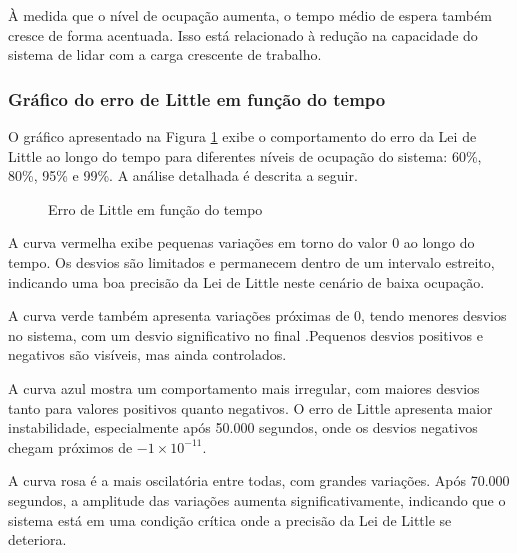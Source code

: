 À medida que o nível de ocupação aumenta, o tempo médio de espera também cresce de forma acentuada. Isso está relacionado à redução na capacidade do sistema de lidar com a carga crescente de trabalho.

\subsubsection{Gráfico do erro de Little em função do tempo}
O gráfico apresentado na Figura \ref{fig:littleE2} exibe o comportamento do erro da Lei de Little ao longo do tempo para diferentes níveis de ocupação do sistema: 60\%, 80\%, 95\% e 99\%. A análise detalhada é descrita a seguir.

\begin{figure}[h!]
   \centering
   
   \caption{Erro de Little em função do tempo}
   \label{fig:littleE2}
\end{figure}

A curva vermelha exibe pequenas variações em torno do valor 0 ao longo do tempo. Os desvios são limitados e permanecem dentro de um intervalo estreito, indicando uma boa precisão da Lei de Little neste cenário de baixa ocupação.

A curva verde também apresenta variações próximas de 0, tendo menores desvios no sistema, com um desvio significativo no final .Pequenos desvios positivos e negativos são visíveis, mas ainda controlados.

 A curva azul mostra um comportamento mais irregular, com maiores desvios tanto para valores positivos quanto negativos. O erro de Little apresenta maior instabilidade, especialmente após 50.000 segundos, onde os desvios negativos chegam próximos de $-1\times10^{-11}$.

A curva rosa é a mais oscilatória entre todas, com grandes variações. Após 70.000 segundos, a amplitude das variações aumenta significativamente, indicando que o sistema está em uma condição crítica onde a precisão da Lei de Little se deteriora.


